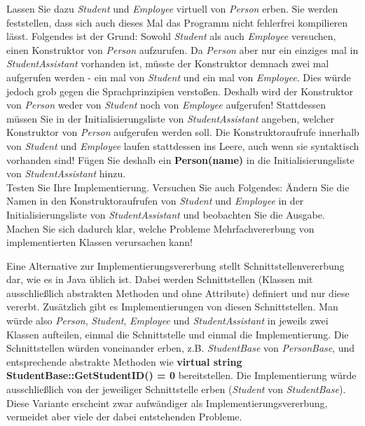 \documentclass[
  accentcolor=tud1c,	%
  colorbacktitle,		%
  inverttitle,			%
  german,				%
  twoside
]{tudexercise}
\begin{document}
\begin{enumerate}
Lassen Sie dazu \emph{Student} und \emph{Employee} virtuell von \emph{Person} erben. Sie werden feststellen, dass sich auch dieses Mal das Programm nicht fehlerfrei kompilieren lässt. Folgendes ist der Grund: Sowohl \emph{Student} als auch \emph{Employee} versuchen, einen Konstruktor von \emph{Person} aufzurufen. Da \emph{Person} aber nur ein einziges mal in \emph{StudentAssistant} vorhanden ist, müsste der Konstruktor demnach zwei mal aufgerufen werden - ein mal von \emph{Student} und ein mal von \emph{Employee}. Dies würde jedoch grob gegen die Sprachprinzipien verstoßen. Deshalb wird der Konstruktor von \emph{Person} weder von \emph{Student} noch von \emph{Employee} aufgerufen! Stattdessen müssen Sie in der Initialisierungsliste von \emph{StudentAssistant} angeben, welcher Konstruktor von \emph{Person} aufgerufen werden soll. Die Konstruktoraufrufe innerhalb von \emph{Student} und \emph{Employee} laufen stattdessen ins Leere, auch wenn sie syntaktisch vorhanden sind! Fügen Sie deshalb ein \textbf{Person(name)} in die Initialisierungsliste von \emph{StudentAssistant} hinzu.\\

Testen Sie Ihre Implementierung. Versuchen Sie auch Folgendes: Ändern Sie die Namen in den Konstruktoraufrufen von \emph{Student} und \emph{Employee} in der Initialisierungsliste von \emph{StudentAssistant} und beobachten Sie die Ausgabe. Machen Sie sich dadurch klar, welche Probleme Mehrfachvererbung von implementierten Klassen verursachen kann!\\

\end{enumerate}

Eine Alternative zur Implementierungsvererbung stellt Schnittstellenvererbung dar, wie es in Java üblich ist. Dabei werden Schnittstellen (Klassen mit ausschließlich abstrakten Methoden und ohne Attribute) definiert und nur diese vererbt. Zusätzlich gibt es Implementierungen von diesen Schnittstellen. Man würde also \emph{Person}, \emph{Student}, \emph{Employee} und \emph{StudentAssistant} in jeweils zwei Klassen aufteilen, einmal die Schnittstelle und einmal die Implementierung. Die Schnittstellen würden voneinander erben, z.B. \emph{StudentBase} von \emph{PersonBase}, und entsprechende abstrakte Methoden wie \textbf{virtual string StudentBase::GetStudentID() = 0} bereitstellen. Die Implementierung würde ausschließlich von der jeweiliger Schnittstelle erben (\emph{Student} von \emph{StudentBase}). Diese Variante erscheint zwar aufwändiger als Implementierungsvererbung, vermeidet aber viele der dabei entstehenden Probleme. 
\end{document}

